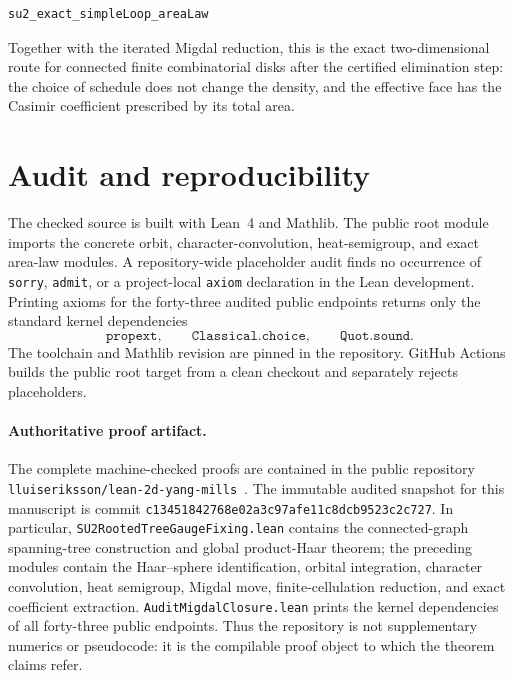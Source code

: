 \documentclass[11pt,a4paper]{article}
\theoremstyle{remark}
\begin{document}
\begin{samepage}
\begin{lstlisting}
su2_exact_simpleLoop_areaLaw
\end{lstlisting}
\end{samepage}

Together with the iterated Migdal reduction, this is the exact
two-dimensional route for connected finite combinatorial disks after the
certified elimination step: the choice of schedule does not change the
density, and the effective face has the Casimir coefficient prescribed by its
total area.

\section{Audit and reproducibility}

The checked source is built with Lean~4 and Mathlib.  The public root module
imports the concrete orbit, character-convolution, heat-semigroup, and exact
area-law modules.  A repository-wide placeholder audit finds no occurrence of
\texttt{sorry}, \texttt{admit}, or a project-local \texttt{axiom} declaration
in the Lean development.  Printing axioms for the forty-three audited public endpoints
returns only the standard kernel dependencies
\[
  \texttt{propext},\qquad \texttt{Classical.choice},\qquad
  \texttt{Quot.sound}.
\]
The toolchain and Mathlib revision are pinned in the repository.  GitHub
Actions builds the public root target from a clean checkout and separately
rejects placeholders.

\paragraph{Authoritative proof artifact.}
The complete machine-checked proofs are contained in the public repository
\texttt{lluiseriksson/lean-2d-yang-mills}~\cite{FormalArtifact}.  The immutable
audited snapshot for this manuscript is commit
\texttt{c13451842768e02a3c97afe11c8dcb9523c2c727}.  In particular,
\texttt{SU2RootedTreeGaugeFixing.lean} contains the connected-graph spanning-tree
construction and global product-Haar theorem; the preceding modules contain
the Haar--sphere identification, orbital integration, character convolution,
heat semigroup, Migdal move, finite-cellulation reduction, and exact coefficient
extraction.  \texttt{AuditMigdalClosure.lean} prints the kernel dependencies of
all forty-three public endpoints.  Thus the repository is not supplementary
numerics or pseudocode: it is the compilable proof object to which the theorem
claims refer.
\end{document}
